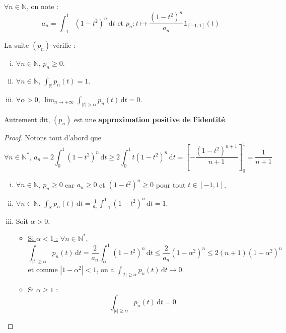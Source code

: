 





	\begin{notation}
		$\forall n \in \mathbb{N}$, on note :
		\[ a_n = \int_{-1}^1 (1-t^2)^n \, \mathrm{d}t \text{ et } p_n : t \mapsto \frac{(1-t^2)^n}{a_n} \mathbb{1}_{[-1, 1]}(t) \]
	\end{notation}

	\begin{lemma}
		\label{theoreme-de-weierstrass-par-la-convolution-1}
		La suite $(p_n)$ vérifie :
		\begin{enumerate}[(i)]
			\item $\forall n \in \mathbb{N}$, $p_n \geq 0$.
			\item $\forall n \in \mathbb{N}$, $\int_{\mathbb{R}} p_n(t) = 1$.
			\item $\forall \alpha > 0$, $\lim_{n \rightarrow +\infty} \int_{|t| > \alpha} p_n(t) \, \mathrm{d}t = 0$.
		\end{enumerate}
		Autrement dit, $(p_n)$ est une \textbf{approximation positive de l'identité}.
	\end{lemma}

	\begin{proof}
		Notons tout d'abord que
		\[ \forall n \in \mathbb{N}^*, \, a_n = 2 \int_0^1 (1-t^2)^n \, \mathrm{d}t \geq 2 \int_0^1 t (1-t^2)^n \, \mathrm{d}t = \left[ - \frac{(1-t^2)^{n+1}}{n+1} \right]_0^1 = \frac{1}{n+1}  \]
		\begin{enumerate}[(i)]
			\item $\forall n \in \mathbb{N}$, $p_n \geq 0$ car $a_n \geq 0$ et $(1-t^2)^n \geq 0$ pour tout $t \in [-1, 1]$.
			\item $\forall n \in \mathbb{N}$, $\int_{\mathbb{R}} p_n(t) \, \mathrm{d}t = \frac{1}{a_n} \int_{-1}^1 (1-t^2)^n \, \mathrm{d}t = 1$.
			\item Soit $\alpha > 0$.
			\begin{itemize}
				\item \uline{Si $\alpha < 1$ :} $\forall n \in \mathbb{N}^*$,
				\[ \int_{|t| \geq \alpha} p_n(t) \, \mathrm{d}t = \frac{2}{a_n} \int_\alpha^1 (1-t^2)^n \, \mathrm{d}t \leq \frac{2}{a_n} (1-\alpha^2)^n \leq 2(n+1)(1-\alpha^2)^n \]
				et comme $|1-\alpha^2| < 1$, on a $\int_{|t| \geq \alpha} p_n(t) \, \mathrm{d}t \longrightarrow 0$.
				\item \uline{Si $\alpha \geq 1$ :}
				\[ \int_{|t| \geq \alpha} p_n(t) \, \mathrm{d}t = 0 \]
			\end{itemize}
		\end{enumerate}
	\end{proof}

